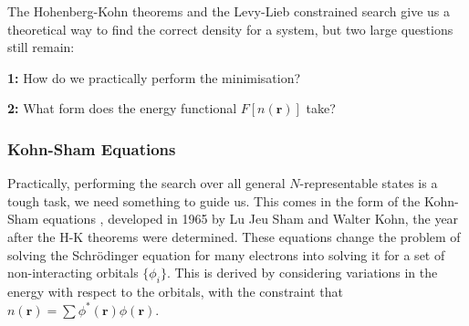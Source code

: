 \documentclass[12pt]{article}
\begin{document}
The Hohenberg-Kohn theorems and the Levy-Lieb constrained search give us a theoretical way to find the correct density for a system, but two large questions still remain: 
\begin{displayquote}
\textbf{1:} How do we practically perform the minimisation?

\textbf{2:} What form does the energy functional $F[n(\mathbf r)]$ take?
\end{displayquote}
\subsubsection{Kohn-Sham Equations}
Practically, performing the search over all general $N$-representable states is a tough task, we need something to guide us. 
This comes in the form of the Kohn-Sham equations \cite{kohn1965self}, developed in 1965 by Lu Jeu Sham and Walter Kohn, the year after the H-K theorems were determined. 
These equations change the problem of solving the Schrödinger equation for many electrons into solving it for a set of non-interacting orbitals $\{\phi_i\}$. This is derived by considering variations in the energy with respect to the orbitals, with the constraint that $n(\mathbf r) = \sum \phi^*(\mathbf r)\phi(\mathbf r)$.
\end{document}
